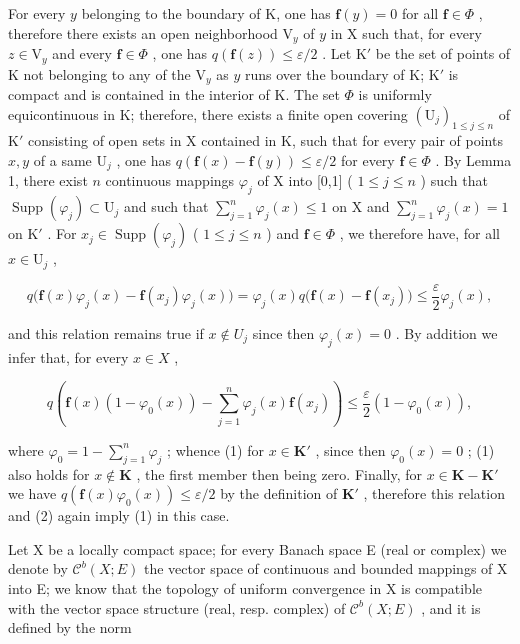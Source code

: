 For every \(y\) belonging to the boundary of K, one has \(\mathbf{f}(y) = 0\) for all \(\mathbf{f} \in \Phi\) , therefore there exists an open neighborhood \(\mathrm{V}_y\) of \(y\) in X such that, for every \(z \in \mathrm{V}_y\) and every \(\mathbf{f} \in \Phi\) , one has \(q(\mathbf{f}(z)) \leqslant \varepsilon / 2\) . Let \(\mathrm{K}'\) be the set of points of K not belonging to any of the \(\mathrm{V}_y\) as \(y\) runs over the boundary of K; \(\mathrm{K}'\) is compact and is contained in the interior of K. The set \(\Phi\) is uniformly equicontinuous in K; therefore, there exists a finite open covering \((\mathrm{U}_j)_{1 \leqslant j \leqslant n}\) of \(\mathrm{K}'\) consisting of open sets in X contained in K, such that for every pair of points \(x, y\) of a same \(\mathrm{U}_j\) , one has \(q(\mathbf{f}(x) - \mathbf{f}(y)) \leqslant \varepsilon / 2\) for every \(\mathbf{f} \in \Phi\) . By Lemma 1, there exist \(n\) continuous mappings \(\varphi_j\) of X into {[}0,1{]} ( \(1 \leqslant j \leqslant n\) ) such that \(\operatorname{Supp}(\varphi_j) \subset \mathrm{U}_j\) and such that \(\sum_{j=1}^{n} \varphi_j(x) \leqslant 1\) on X and \(\sum_{j=1}^{n} \varphi_j(x) = 1\) on \(\mathrm{K}'\) . For \(x_j \in \operatorname{Supp}(\varphi_j)\) ( \(1 \leqslant j \leqslant n\) ) and \(\mathbf{f} \in \Phi\) , we therefore have, for all \(x \in \mathrm{U}_j\) ,

\[
q \big (\mathbf {f} (x) \varphi_ {j} (x) - \mathbf {f} (x _ {j}) \varphi_ {j} (x) \big) = \varphi_ {j} (x) q \big (\mathbf {f} (x) - \mathbf {f} (x _ {j}) \big) \leqslant \frac {\varepsilon}{2} \varphi_ {j} (x),
\]

and this relation remains true if \(x \notin U_{j}\) since then \(\varphi_{j}(x) = 0\) . By addition we infer that, for every \(x \in X\) ,

\[
q \left(\mathbf {f} (x) \left(1 - \varphi_ {0} (x)\right) - \sum_ {j = 1} ^ {n} \varphi_ {j} (x) \mathbf {f} \left(x _ {j}\right)\right) \leqslant \frac {\varepsilon}{2} \left(1 - \varphi_ {0} (x)\right),\tag{2}
\]

where \(\varphi_0 = 1 - \sum_{j=1}^{n} \varphi_j\) ; whence (1) for \(x \in \mathbf{K}'\) , since then \(\varphi_0(x) = 0\) ; (1) also holds for \(x \notin \mathbf{K}\) , the first member then being zero. Finally, for \(x \in \mathbf{K} - \mathbf{K}'\) we have \(q(\mathbf{f}(x)\varphi_0(x)) \leqslant \varepsilon/2\) by the definition of \(\mathbf{K}'\) , therefore this relation and (2) again imply (1) in this case.

Let X be a locally compact space; for every Banach space E (real or complex) we denote by \(\mathcal{C}^{b}(X;E)\) the vector space of continuous and bounded mappings of X into E; we know that the topology of uniform convergence in X is compatible with the vector space structure (real, resp. complex) of \(\mathcal{C}^{b}(X;E)\) , and it is defined by the norm


